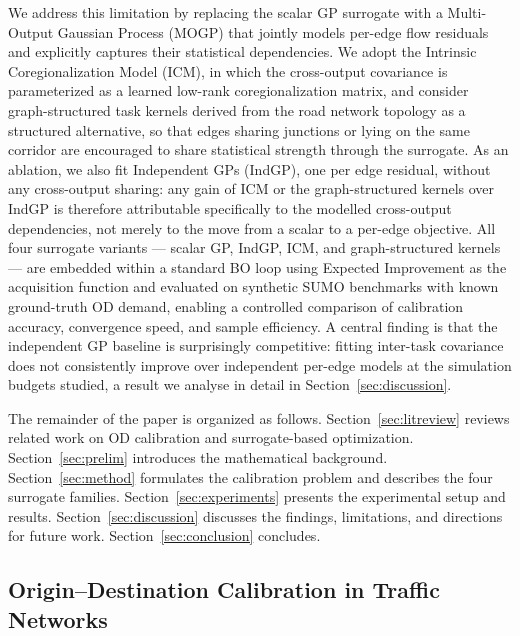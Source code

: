 \documentclass[11pt]{article}
\begin{document}
We address this limitation by replacing the scalar GP surrogate with a Multi-Output Gaussian Process (MOGP) that jointly models per-edge flow residuals and explicitly captures their statistical dependencies. We adopt the Intrinsic Coregionalization Model (ICM), in which the cross-output covariance is parameterized as a learned low-rank coregionalization matrix, and consider graph-structured task kernels derived from the road network topology as a structured alternative, so that edges sharing junctions or lying on the same corridor are encouraged to share statistical strength through the surrogate. As an ablation, we also fit Independent GPs (IndGP), one per edge residual, without any cross-output sharing: any gain of ICM or the graph-structured kernels over IndGP is therefore attributable specifically to the modelled cross-output dependencies, not merely to the move from a scalar to a per-edge objective. All four surrogate variants — scalar GP, IndGP, ICM, and graph-structured kernels — are embedded within a standard BO loop using Expected Improvement as the acquisition function and evaluated on synthetic SUMO benchmarks with known ground-truth OD demand, enabling a controlled comparison of calibration accuracy, convergence speed, and sample efficiency. A central finding is that the independent GP baseline is surprisingly competitive: fitting inter-task covariance does not consistently improve over independent per-edge models at the simulation budgets studied, a result we analyse in detail in Section~\ref{sec:discussion}.


The remainder of the paper is organized as follows. Section~\ref{sec:litreview} reviews related work on OD calibration and surrogate-based optimization. Section~\ref{sec:prelim} introduces the mathematical background. Section~\ref{sec:method} formulates the calibration problem and describes the four surrogate families. Section~\ref{sec:experiments} presents the experimental setup and results. Section~\ref{sec:discussion} discusses the findings, limitations, and directions for future work. Section~\ref{sec:conclusion} concludes.


\subsection{Origin--Destination Calibration in Traffic Networks}
\end{document}
